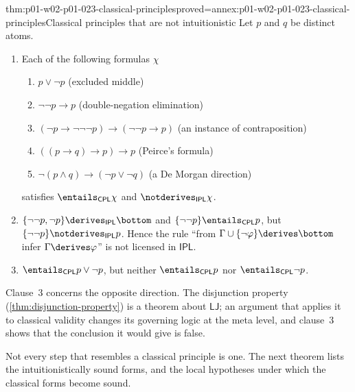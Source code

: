 \begin{hbtheorem}{thm:p01-w02-p01-023-classical-principles}{proved=annex:p01-w02-p01-023-classical-principles}{Classical principles that are not intuitionistic}
Let \(p\) and \(q\) be distinct atoms.
\begin{enumerate}
  \item Each of the following formulas \(\chi\)
        \begin{enumerate}
          \item[(a)] \(p\lor\neg p\) \hfill(excluded middle)
          \item[(b)] \(\neg\neg p\to p\) \hfill(double-negation elimination)
          \item[(c)] \((\neg p\to\neg\neg\neg p)\to(\neg\neg p\to p)\)
                \hfill(an instance of contraposition)
          \item[(d)] \(((p\to q)\to p)\to p\) \hfill(Peirce's formula)
          \item[(e)] \(\neg(p\land q)\to(\neg p\lor\neg q)\)
                \hfill(a De Morgan direction)
        \end{enumerate}
        satisfies \(\entails_{\mathsf{CPL}}\chi\) and
        \(\notderives_{\mathsf{IPL}}\chi\).
  \item \(\{\neg\neg p,\neg p\}\derives_{\mathsf{IPL}}\bottom\) and
        \(\{\neg\neg p\}\entails_{\mathsf{CPL}}p\), but
        \(\{\neg\neg p\}\notderives_{\mathsf{IPL}}p\). Hence the rule
        ``from \(\Gamma\cup\{\neg\varphi\}\derives\bottom\) infer
        \(\Gamma\derives\varphi\)'' is not licensed in \(\mathsf{IPL}\).
  \item \(\entails_{\mathsf{CPL}}p\lor\neg p\), but neither
        \(\entails_{\mathsf{CPL}}p\) nor \(\entails_{\mathsf{CPL}}\neg p\).
\end{enumerate}
\end{hbtheorem}

Clause~3 concerns the opposite direction. The disjunction property
(\cref{thm:disjunction-property}) is a theorem about \(\mathsf{LJ}\); an
argument that applies it to classical validity changes its governing logic
at the meta level, and clause~3 shows that the conclusion it would give is
false.

Not every step that resembles a classical principle is one. The next theorem
lists the intuitionistically sound forms, and the local hypotheses under
which the classical forms become sound.

